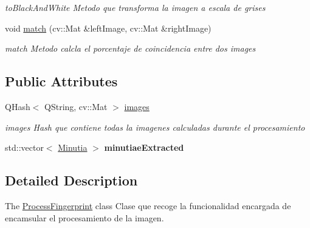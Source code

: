 \begin{DoxyCompactItemize}
\begin{DoxyCompactList}\small\item\em to\+Black\+And\+White Metodo que transforma la imagen a escala de grises \end{DoxyCompactList}\item 
void \hyperlink{class_process_fingerprint_a50eaef1419b0158557d2c69cc0de9158}{match} (cv\+::\+Mat \&left\+Image, cv\+::\+Mat \&right\+Image)
\begin{DoxyCompactList}\small\item\em match Metodo calcla el porcentaje de coincidencia entre dos images \end{DoxyCompactList}\end{DoxyCompactItemize}
\subsection*{Public Attributes}
\begin{DoxyCompactItemize}
\item 
\hypertarget{class_process_fingerprint_ad8741edbfccab09151379c7593f94b88}{Q\+Hash$<$ Q\+String, cv\+::\+Mat $>$ \hyperlink{class_process_fingerprint_ad8741edbfccab09151379c7593f94b88}{images}}\label{class_process_fingerprint_ad8741edbfccab09151379c7593f94b88}

\begin{DoxyCompactList}\small\item\em images Hash que contiene todas la imagenes calculadas durante el procesamiento \end{DoxyCompactList}\item 
\hypertarget{class_process_fingerprint_adee788daa10a3cc900959c57e15ffd37}{std\+::vector$<$ \hyperlink{class_minutia}{Minutia} $>$ {\bfseries minutiae\+Extracted}}\label{class_process_fingerprint_adee788daa10a3cc900959c57e15ffd37}

\end{DoxyCompactItemize}


\subsection{Detailed Description}
The \hyperlink{class_process_fingerprint}{Process\+Fingerprint} class Clase que recoge la funcionalidad encargada de encamsular el procesamiento de la imagen. 


